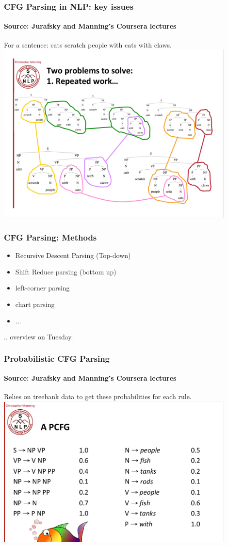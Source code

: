 \documentclass{beamer}
\begin{document}
\begin{frame}
\frametitle{CFG Parsing in NLP: key issues}
\framesubtitle{Source: Jurafsky and Manning's Coursera lectures}
For a sentence: cats scratch people with cats with claws.
\includegraphics[width=0.9\textwidth]{parsing.png}
\end{frame}

\begin{frame}
\frametitle{CFG Parsing: Methods}
\begin{itemize}
\item Recursive Descent Parsing (Top-down)
\item Shift Reduce parsing (bottom up)
\item left-corner parsing
\item chart parsing
\item ...
\end{itemize}
.. overview on Tuesday.
\end{frame}

\begin{frame}
\frametitle{Probabilistic CFG Parsing}
\framesubtitle{Source: Jurafsky and Manning's Coursera lectures}
Relies on treebank data to get these probabilities for each rule.
\includegraphics[width=0.9\textwidth]{pcfg.png}
\end{frame}
\end{document}
